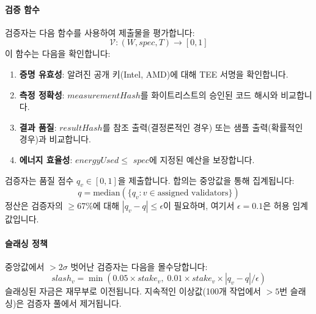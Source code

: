 \documentclass[11pt]{article}
\begin{document}
\paragraph{검증 함수} 검증자는 다음 함수를 사용하여 제출물을 평가합니다:
\begin{equation}
\mathcal{V}: (W, spec, T) \rightarrow [0, 1]
\end{equation}
이 함수는 다음을 확인합니다:
\begin{enumerate}[noitemsep]
  \item \textbf{증명 유효성}: 알려진 공개 키(Intel, AMD)에 대해 TEE 서명을 확인합니다.
  \item \textbf{측정 정확성}: $measurementHash$를 화이트리스트의 승인된 코드 해시와 비교합니다.
  \item \textbf{결과 품질}: $resultHash$를 참조 출력(결정론적인 경우) 또는 샘플 출력(확률적인 경우)과 비교합니다.
  \item \textbf{에너지 효율성}: $energyUsed \leq$ $spec$에 지정된 예산을 보장합니다.
\end{enumerate}
검증자는 품질 점수 $q_v \in [0,1]$을 제출합니다. 합의는 중앙값을 통해 집계됩니다:
\begin{equation}
q = \text{median}(\{q_v : v \in \text{assigned validators}\})
\end{equation}
정산은 검증자의 $\geq 67\%$에 대해 $|q_v - q| \leq \epsilon$이 필요하며, 여기서 $\epsilon = 0.1$은 허용 임계값입니다.

\paragraph{슬래싱 정책} 중앙값에서 $>2\sigma$ 벗어난 검증자는 다음을 몰수당합니다:
\begin{equation}
slash_v = \min(0.05 \times stake_v, \; 0.01 \times stake_v \times |q_v - q| / \epsilon)
\end{equation}
슬래싱된 자금은 재무부로 이전됩니다. 지속적인 이상값(100개 작업에서 $>5$번 슬래싱)은 검증자 풀에서 제거됩니다.
\end{document}
